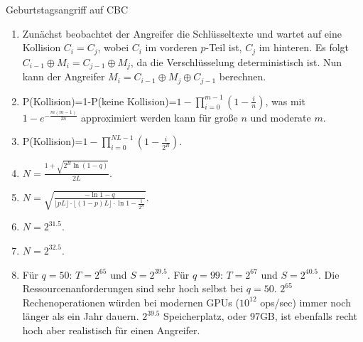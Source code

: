\documentclass{article}
\begin{document}
\begin{exercise}{Geburtstagsangriff auf CBC}
  \begin{solution}
    \begin{enumerate}
      \item Zunächst beobachtet der Angreifer die Schlüsseltexte und wartet auf eine Kollision $C_i=C_j$, wobei $C_i$ im vorderen $p$-Teil ist, $C_j$ im hinteren. Es folgt $C_{i-1}\oplus M_i = C_{j-1} \oplus M_j$, da die Verschlüsselung deterministisch ist. Nun kann der Angreifer $M_i=C_{i-1}\oplus M_j \oplus C_{j-1}$ berechnen.
      \item P(Kollision)=1-P(keine Kollision)=$1-\prod_{i=0}^{m-1}{(1-\frac{i}{n})}$, was mit $1-e^{-\frac{m(m-1)}{2n}}$ approximiert werden kann für große $n$ und moderate $m$.
      \item P(Kollision)=$1-\prod_{i=0}^{NL-1}{(1-\frac{i}{2^B})}$.
      \item $N=\frac{1+\sqrt{2^B\ln(1-q)}}{2L}$.
      \item $N=\sqrt{\frac{-\ln{1-q}}{\lfloor pL\rfloor\cdot \lfloor (1-p)L \rfloor\cdot \ln{1-\frac{1}{2^B}}}}$.
      \item $N=2^{31.5}$.
      \item $N=2^{32.5}$.
      \item Für $q=50$: $T=2^{65}$ und $S=2^{39.5}$. Für $q=99$: $T=2^{67}$ und $S=2^{40.5}$.
        Die Ressourcenanforderungen sind sehr hoch selbst bei $q=50$. $2^{65}$ Rechenoperationen würden bei modernen GPUs ($10^12$ ops/sec) immer noch länger als ein Jahr dauern. $2^{39.5}$ Speicherplatz, oder 97GB, ist ebenfalls recht hoch aber realistisch für einen Angreifer.
    \end{enumerate}
  \end{solution}
\end{exercise}



\end{document}
